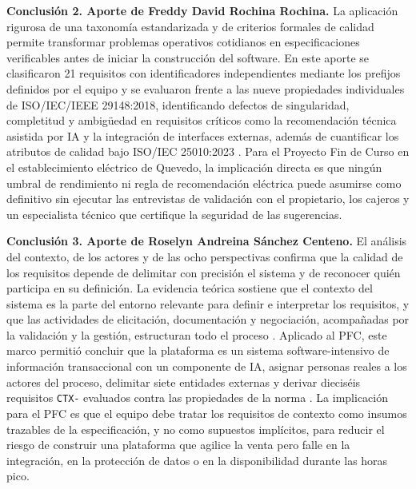 \documentclass[onecolumn,12pt,a4paper]{IEEEtran}
\begin{document}
\noindent\textbf{Conclusión 2. Aporte de Freddy David Rochina Rochina.}
La aplicaci\'on rigurosa de una taxonom\'ia estandarizada y de criterios formales de calidad permite transformar problemas operativos cotidianos en especificaciones verificables antes de iniciar la construcci\'on del software. En este aporte se clasificaron 21 requisitos con identificadores independientes mediante los prefijos definidos por el equipo y se evaluaron frente a las nueve propiedades individuales de ISO/IEC/IEEE 29148:2018, identificando defectos de singularidad, completitud y ambig\"uedad en requisitos cr\'iticos como la recomendaci\'on t\'ecnica asistida por IA y la integraci\'on de interfaces externas, adem\'as de cuantificar los atributos de calidad bajo ISO/IEC 25010:2023 \cite{iso29148,iso25010,pohl2025}. Para el Proyecto Fin de Curso en el establecimiento el\'ectrico de Quevedo, la implicaci\'on directa es que ning\'un umbral de rendimiento ni regla de recomendaci\'on el\'ectrica puede asumirse como definitivo sin ejecutar las entrevistas de validaci\'on con el propietario, los cajeros y un especialista t\'ecnico que certifique la seguridad de las sugerencias.

\noindent\textbf{Conclusión 3. Aporte de Roselyn Andreina Sánchez Centeno.}
El an\'alisis del contexto, de los actores y de las ocho perspectivas confirma que la calidad de los requisitos depende de delimitar con precisi\'on el sistema y de reconocer qui\'en participa en su definici\'on. La evidencia te\'orica sostiene que el contexto del sistema es la parte del entorno relevante para definir e interpretar los requisitos, y que las actividades de elicitaci\'on, documentaci\'on y negociaci\'on, acompa\~nadas por la validaci\'on y la gesti\'on, estructuran todo el proceso \cite{pohl2025,iso29148}. Aplicado al PFC, este marco permiti\'o concluir que la plataforma es un sistema software-intensivo de informaci\'on transaccional con un componente de IA, asignar personas reales a los actores del proceso, delimitar siete entidades externas y derivar diecis\'eis requisitos \texttt{CTX-} evaluados contra las propiedades de la norma \cite{iso29148,iso25010}. La implicaci\'on para el PFC es que el equipo debe tratar los requisitos de contexto como insumos trazables de la especificaci\'on, y no como supuestos impl\'icitos, para reducir el riesgo de construir una plataforma que agilice la venta pero falle en la integraci\'on, en la protecci\'on de datos o en la disponibilidad durante las horas pico.
\end{document}
